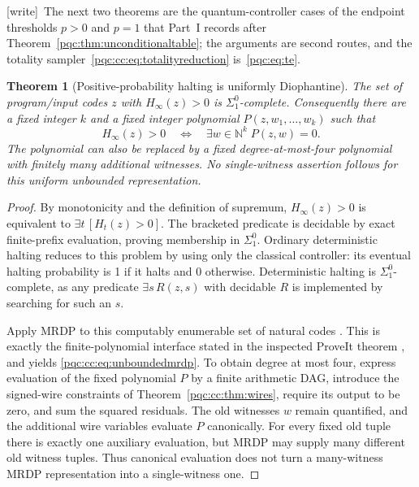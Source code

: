 \documentclass[11pt,letterpaper]{article}
\numberwithin{equation}{section}
\newtheorem{theorem}{Theorem}[section]
\theoremstyle{definition}
\theoremstyle{remark}
\newcommand{\N}{\mathbb N}
\newcommand{\wtag}{\textup{[write]}}
\begin{document}
\wtag\ The next two theorems are the quantum-controller cases of the endpoint thresholds $p>0$ and $p=1$ that Part~I records after Theorem~\ref{pqc:thm:unconditionaltable}; the arguments are second routes, and the totality sampler~\eqref{pqc:cc:eq:totalityreduction} is~\eqref{pqc:eq:te}.

\begin{theorem}[Positive-probability halting is uniformly Diophantine]
\label{pqc:cc:thm:positivehalting}
The set of program/input codes $z$ with $H_\infty(z)>0$ is
$\Sigma^0_1$-complete. Consequently there are a fixed integer $k$ and a fixed
integer polynomial $P(z,w_1,\ldots,w_k)$ such that
\begin{equation}
 H_\infty(z)>0\quad\Longleftrightarrow\quad
 \exists w\in\N^k\;P(z,w)=0.
\label{pqc:cc:eq:unboundedmrdp}
\end{equation}
The polynomial can also be replaced by a fixed degree-at-most-four polynomial
with finitely many additional witnesses. No single-witness assertion follows
for this uniform unbounded representation.
\end{theorem}
\begin{proof}
By monotonicity and the definition of supremum,
$H_\infty(z)>0$ is equivalent to $\exists t\,[H_t(z)>0]$. The bracketed predicate
is decidable by exact finite-prefix evaluation, proving membership in
$\Sigma^0_1$. Ordinary deterministic halting reduces to this problem by using
only the classical controller: its eventual halting probability is 1 if it
halts and 0 otherwise. Deterministic halting is $\Sigma^0_1$-complete, as any
predicate $\exists s\,R(z,s)$ with decidable $R$ is implemented by searching
for such an $s$.

Apply MRDP to this computably enumerable set of natural codes
\cite{b62-matiyasevich1970}. This is exactly
the finite-polynomial interface stated in the inspected ProveIt theorem
\cite{b62s10-ProveItMRDP}, and yields \eqref{pqc:cc:eq:unboundedmrdp}. To obtain degree at most
four, express evaluation of the fixed polynomial $P$ by a finite arithmetic
DAG, introduce the signed-wire constraints of Theorem~\ref{pqc:cc:thm:wires}, require
its output to be zero, and sum the squared residuals. The old witnesses $w$
remain quantified, and the additional wire variables evaluate $P$ canonically.
For every fixed old tuple there is exactly one auxiliary evaluation, but MRDP
may supply many different old witness tuples. Thus canonical evaluation does
not turn a many-witness MRDP representation into a single-witness one.
\end{proof}
\end{document}
